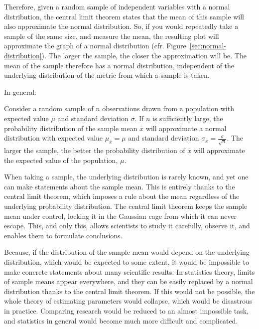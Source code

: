 Therefore, given a random sample of independent variables with a normal distribution,
the central limit theorem states that the mean of this sample will also approximate the normal distribution.
So, if you would repeatedly take a sample of the same size, and measure the mean, the resulting plot will approximate the graph of a normal distribution (cfr. Figure~\ref{sec:normal-distribution}).
The larger the sample, the closer the approximation will be.
The mean of the sample therefore has a normal distribution, independent of the underlying distribution of the metric from which a sample is taken. 

In general:

\begin{definition}
  Consider a random sample of $n$ observations drawn from a population with expected value $\mu$ and standard deviation $\sigma$.
  If $n$ is sufficiently large, the probability distribution of the sample mean $\overline{x}$ will approximate a normal distribution with expected value $\mu_{\overline{x}} = \mu$ and standard deviation $\sigma_{\overline{x}} = \frac{\sigma}{\sqrt{n}}$.
  The larger the sample, the better the probability distribution of $\overline{x}$ will approximate the expected value of the population, $\mu$.
\end{definition}

When taking a sample, the underlying distribution is rarely known, and yet one can make statements about the sample mean. This is entirely thanks to the central limit theorem, which imposes a rule about the mean regardless of the underlying probability distribution. 
The central limit theorem keeps the sample mean under control, locking it in the Gaussian cage from which it can never escape. This, and only this, allows scientists to study it carefully, observe it, and enables them to formulate conclusions.

Because, if the distribution of the sample mean would depend on the underlying distribution, which would be expected to some extent, it would be impossible to make concrete statements about many scientific results. 
In statistics theory, limits of sample means appear everywhere, and they can be easily replaced by a normal distribution thanks to the central limit theorem. 
If this would not be possible, the whole theory of estimating parameters would collapse, which would be disastrous in practice. 
Comparing research would be reduced to an almost impossible task, and statistics in general would become much more difficult and complicated.

